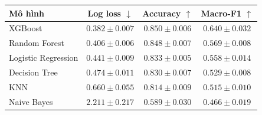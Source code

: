 \begin{tabular}{lccc}
\toprule
Mô hình & Log loss $\downarrow$ & Accuracy $\uparrow$ & Macro-F1 $\uparrow$ \\
\midrule
XGBoost & $0.382\pm0.007$ & $0.850\pm0.006$ & $0.640\pm0.032$ \\
Random Forest & $0.406\pm0.006$ & $0.848\pm0.007$ & $0.569\pm0.008$ \\
Logistic Regression & $0.441\pm0.009$ & $0.833\pm0.005$ & $0.558\pm0.014$ \\
Decision Tree & $0.474\pm0.011$ & $0.830\pm0.007$ & $0.529\pm0.008$ \\
KNN & $0.660\pm0.055$ & $0.814\pm0.009$ & $0.515\pm0.010$ \\
Naive Bayes & $2.211\pm0.217$ & $0.589\pm0.030$ & $0.466\pm0.019$ \\
\bottomrule
\end{tabular}
